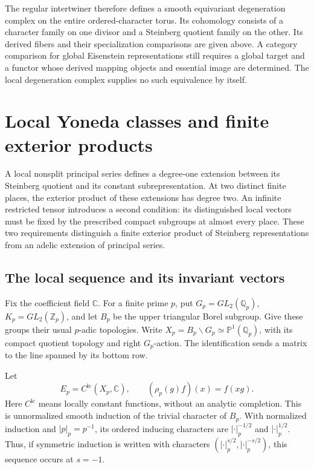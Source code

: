 The regular intertwiner therefore defines a smooth equivariant degeneration complex on the entire ordered-character torus.
Its cohomology consists of a character family on one divisor and a Steinberg quotient family on the other.
Its derived fibers and their specialization comparisons are given above.
A category comparison for global Eisenstein representations still requires a global target and a functor
whose derived mapping objects and essential image are determined.
The local degeneration complex supplies no such equivalence by itself.


\section{Local Yoneda classes and finite exterior products}
\label{v4-arith:ic:w10-d:X1}

A local nonsplit principal series defines a degree-one extension between
its Steinberg quotient and its constant subrepresentation. At two distinct
finite places, the exterior product of these extensions has degree two.
An infinite restricted tensor introduces a second condition: its
distinguished local vectors must be fixed by the prescribed compact
subgroups at almost every place. These two requirements distinguish a
finite exterior product of Steinberg representations from an adelic
extension of principal series.

\subsection{The local sequence and its invariant vectors}

Fix the coefficient field $\mathbb C$. For a finite prime $p$, put
$G_p=GL_2(\mathbb Q_p)$, $K_p=GL_2(\mathbb Z_p)$, and let $B_p$ be the upper triangular
Borel subgroup. Give these groups their usual $p$-adic topologies.
Write $X_p=B_p\backslash G_p\simeq\mathbb P^1(\mathbb Q_p)$, with its compact
quotient topology and right $G_p$-action. The identification sends a matrix
to the line spanned by its bottom row.

Let
\[
 E_p=C^{\mathrm{lc}}(X_p,\mathbb C),\qquad
 (\rho_p(g)f)(x)=f(xg).
\]
Here $C^{\mathrm{lc}}$ means locally constant functions, without an
analytic completion. This is unnormalized smooth induction of the trivial
character of $B_p$. With normalized induction and $|p|_p=p^{-1}$, its
ordered inducing characters are $|\cdot|_p^{-1/2}$ and
$|\cdot|_p^{1/2}$. Thus, if symmetric induction is written with characters
$(|\cdot|_p^{s/2},|\cdot|_p^{-s/2})$, this sequence occurs at $s=-1$.

